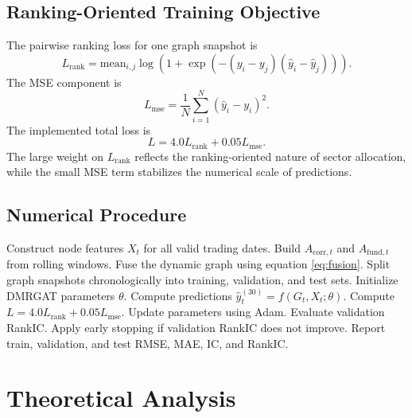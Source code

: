 \documentclass[12pt]{article}
\begin{document}
\subsection{Ranking-Oriented Training Objective}

The pairwise ranking loss for one graph snapshot is
\begin{equation}
L_{\mathrm{rank}}
=\mathrm{mean}_{i,j}\log\left(1+
\exp\left(-(y_i-y_j)(\widehat{y}_i-\widehat{y}_j)\right)\right).
\end{equation}
The MSE component is
\begin{equation}
L_{\mathrm{mse}}=\frac{1}{N}\sum_{i=1}^{N}(\widehat{y}_i-y_i)^2.
\end{equation}
The implemented total loss is
\begin{equation}
L=4.0L_{\mathrm{rank}}+0.05L_{\mathrm{mse}}.
\label{eq:loss}
\end{equation}
The large weight on $L_{\mathrm{rank}}$ reflects the ranking-oriented nature of sector allocation, while the small MSE term stabilizes the numerical scale of predictions.

\subsection{Numerical Procedure}

\begin{algorithm}[H]
\caption{DMRGAT Training Procedure}
\label{alg:dmrgat}
\begin{algorithmic}[1]
\State Construct node features $X_t$ for all valid trading dates.
\State Build $A_{\mathrm{corr},t}$ and $A_{\mathrm{fund},t}$ from rolling windows.
\State Fuse the dynamic graph using equation \eqref{eq:fusion}.
\State Split graph snapshots chronologically into training, validation, and test sets.
\State Initialize DMRGAT parameters $\theta$.
        \State Compute predictions $\widehat{y}_{t}^{(30)}=f(G_t,X_t;\theta)$.
        \State Compute $L=4.0L_{\mathrm{rank}}+0.05L_{\mathrm{mse}}$.
        \State Update parameters using Adam.
    \EndFor
    \State Evaluate validation RankIC.
    \State Apply early stopping if validation RankIC does not improve.
\EndFor
\State Report train, validation, and test RMSE, MAE, IC, and RankIC.
\end{algorithmic}
\end{algorithm}

\section{Theoretical Analysis}
\label{sec:theory}
\end{document}
